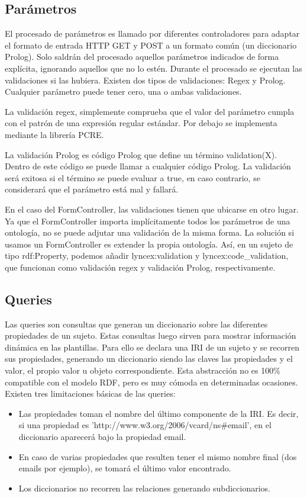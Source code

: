 \documentclass[12pt]{report} %
\begin{document}
\subsection{Parámetros}
El procesado de parámetros es llamado por diferentes controladores para adaptar el formato de entrada HTTP GET y POST a un formato común (un diccionario Prolog).
Solo saldrán del procesado aquellos parámetros indicados de forma explícita, ignorando aquellos que no lo estén.
Durante el procesado se ejecutan las validaciones si las hubiera. Existen dos tipos de validaciones: Regex y Prolog.
Cualquier parámetro puede tener cero, una o ambas validaciones.

La validación regex, simplemente comprueba que el valor del parámetro cumpla con el patrón de una expresión regular estándar. Por debajo se implementa mediante la librería PCRE.

La validación Prolog es código Prolog que define un término validation(X). Dentro de este código se puede llamar a cualquier código Prolog.
La validación será exitosa si el término se puede evaluar a true, en caso contrario, se considerará que el parámetro está mal y fallará.

En el caso del FormController, las validaciones tienen que ubicarse en otro lugar. Ya que el FormController importa implícitamente todos los parámetros de una ontología, no se puede adjutar una validación de la misma forma.
La solución si usamos un FormController es extender la propia ontología.
Así, en un sujeto de tipo rdf:Property, podemos añadir lyncex:validation y lyncex:code\_validation, que funcionan como validación regex y validación Prolog, respectivamente.

\subsection{Queries}

Las queries son consultas que generan un diccionario sobre las diferentes propiedades de un sujeto. Estas consultas luego sirven para mostrar información dinámica en las plantillas. Para ello se declara una IRI de un sujeto y se recorren sus propiedades, generando un diccionario siendo las claves las propiedades y el valor, el propio valor u objeto correspondiente. Esta abstracción no es 100\% compatible con el modelo RDF, pero es muy cómoda en determinadas ocasiones. Existen tres limitaciones básicas de las queries:
\begin{itemize}
    \item Las propiedades toman el nombre del último componente de la IRI. Es decir, si una propiedad es 'http://www.w3.org/2006/vcard/ns\#email', en el diccionario aparecerá bajo la propiedad email.
    \item En caso de varias propiedades que resulten tener el mismo nombre final (dos emails por ejemplo), se tomará el último valor encontrado.
    \item Los diccionarios no recorren las relaciones generando subdiccionarios.
\end{itemize}
\end{document}
